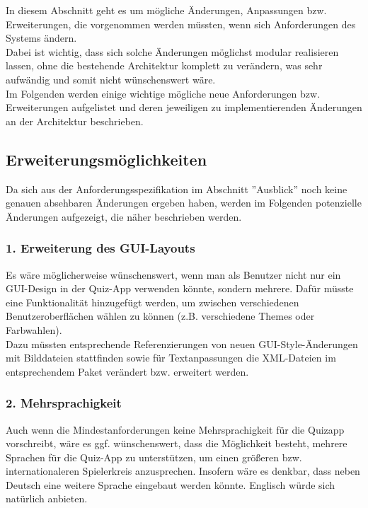 
In diesem Abschnitt geht es um mögliche Änderungen, Anpassungen bzw. Erweiterungen, die vorgenommen werden müssten, wenn sich Anforderungen des Systems ändern. \\
Dabei ist wichtig, dass sich solche Änderungen möglichst modular realisieren lassen, ohne die bestehende Architektur komplett zu verändern, was sehr aufwändig und somit nicht wünschenswert wäre. \\
Im Folgenden werden einige wichtige mögliche neue Anforderungen bzw. Erweiterungen aufgelistet und deren jeweiligen zu implementierenden Änderungen an der Architektur beschrieben. 


\subsection*{Erweiterungsmöglichkeiten}

Da sich aus der Anforderungsspezifikation im Abschnitt ''Ausblick'' noch keine genauen absehbaren Änderungen ergeben haben, werden im Folgenden potenzielle Änderungen aufgezeigt, die näher beschrieben werden.

\subsubsection*{1. Erweiterung des GUI-Layouts}

Es wäre möglicherweise wünschenswert, wenn man als Benutzer nicht nur ein GUI-Design in der Quiz-App verwenden könnte, sondern mehrere. Dafür müsste eine Funktionalität hinzugefügt werden, um zwischen verschiedenen Benutzeroberflächen wählen zu können (z.B. verschiedene Themes oder Farbwahlen). \\
Dazu müssten entsprechende Referenzierungen von neuen GUI-Style-Änderungen mit Bilddateien stattfinden sowie für Textanpassungen die XML-Dateien im entsprechendem Paket verändert bzw. erweitert werden. 

\subsubsection*{2. Mehrsprachigkeit}

Auch wenn die Mindestanforderungen keine Mehrsprachigkeit für die Quizapp vorschreibt, wäre es ggf. wünschenswert, dass die Möglichkeit besteht, mehrere Sprachen für die Quiz-App zu unterstützen, um einen größeren bzw. internationaleren Spielerkreis anzusprechen. Insofern wäre es denkbar, dass neben Deutsch eine weitere Sprache eingebaut werden könnte. Englisch würde sich natürlich anbieten.
